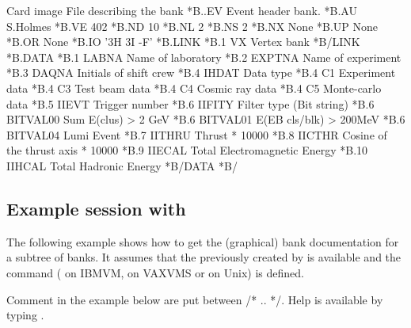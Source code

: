 \begin{XMPt}{Card image File describing the bank }
*B..EV  Event header bank.
*B.AU    S.Holmes
*B.VE    402
*B.ND    10
*B.NL    2
*B.NS    2
*B.NX    None
*B.UP    None
*B.OR    None
*B.IO    '3H 3I -F'
*B.LINK
*B.1   VX       Vertex bank
*B/LINK
*B.DATA
*B.1   LABNA     Name of laboratory
*B.2   EXPTNA    Name of experiment
*B.3   DAQNA     Initials of shift crew 
*B.4   IHDAT     Data type
*B.4   C1        Experiment data
*B.4   C3        Test beam data
*B.4   C4        Cosmic ray data
*B.4   C5        Monte-carlo data
*B.5   IIEVT     Trigger number
*B.6   IIFITY    Filter type (Bit string)
*B.6   BITVAL00  Sum E(clus) > 2 GeV
*B.6   BITVAL01  E(EB cls/blk) > 200MeV
*B.6   BITVAL04  Lumi Event
*B.7   IITHRU    Thrust * 10000
*B.8   IICTHR    Cosine of the thrust axis * 10000
*B.9   IIECAL    Total Electromagnetic Energy
*B.10  IIHCAL    Total Hadronic Energy
*B/DATA
*B/
\end{XMPt}
 
\newpage

\subsection[Example session with {\tt DZEDIT}]{Example session with }
 
The following example shows how to get the (graphical) bank
documentation for a subtree of banks. 
It assumes that the \RZfile{} previously created by  
is available and the command 
 ( on IBMVM, 
 on VAXVMS or  on Unix) is defined. 
 
Comment in the example below are put between /* .. */.
Help is available by typing .
 
